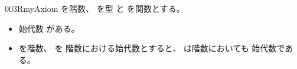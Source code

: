 \documentclass[index]{subfiles}
\begin{document}
\begin{myBlock}{003R}{myAxiom}
  を階数、
  を型
  と
  を関数とする。
  \begin{itemize}
  \item 始代数
    がある。
  \item {}を階数、
    を
    階数における始代数とすると、
    は階数においても
    始代数である。
  \end{itemize}
\end{myBlock}
\end{document}
